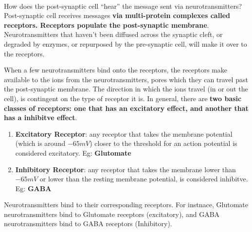 \documentclass[12pt, a4paper]{article}
\begin{document}
\paragraph*{}
How does the post-synaptic cell ``hear'' the message sent via neurotransmitters?
Post-synaptic cell receives messages \textbf{via multi-protein complexes called receptors.
Receptors populate the post-synaptic membrane}. Neurotransmitters that haven't been diffused across the synaptic cleft,
or degraded by enzymes, or repurposed by the pre-synaptic cell, will make it over to the receptors.

When a few neurotransmitters bind onto the receptors, the receptors make available to the ions from 
the neurotransmitters, pores which they can travel past the post-synaptic membrane. The direction
in which the ions travel (in or out the cell), is contingent on the type of receptor it is.
In general, there are \textbf{two basic classes of receptors: one that has an excitatory effect,
and another that has a inhibitve effect}.

\begin{enumerate}
    \item \textbf{Excitatory Receptor}: any receptor that takes the membrane potential (which is around $-65mV$) closer to the 
    threshold for an action potential is considered excitatory. Eg: \textbf{Glutomate}
    \item  \textbf{Inhibitory Receptor}: any receptor that takes the membrane lower than $-65mV$ or lower than the resting membrane potential,
    is considered inhibitve. Eg: \textbf{GABA}
\end{enumerate}

Neurotransmitters bind to their corresponding receptors. For instnace, Glutomate neurotransmitters bind to 
Glutomate receptors (excitatory), and GABA neurotransmitters bind to GABA receptors (Inhibitory).
\end{document}
